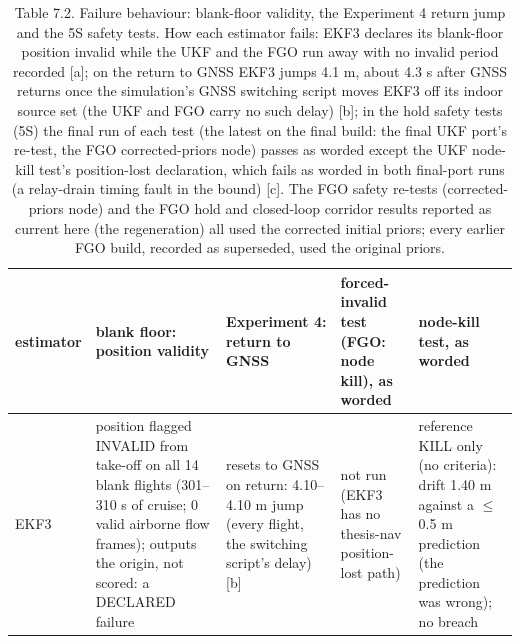 \begin{table}[htbp]
\centering
\footnotesize
\caption{Table 7.2. Failure behaviour: blank-floor validity, the Experiment 4 return jump and the 5S safety tests. How each estimator fails: EKF3 declares its blank-floor position invalid while the UKF and the FGO run away with no invalid period recorded [a]; on the return to GNSS EKF3 jumps 4.1 m, about 4.3 s after GNSS returns once the simulation's GNSS switching script moves EKF3 off its indoor source set (the UKF and FGO carry no such delay) [b]; in the hold safety tests (5S) the final run of each test (the latest on the final build: the final UKF port's re-test, the FGO corrected-priors node) passes as worded except the UKF node-kill test's position-lost declaration, which fails as worded in both final-port runs (a relay-drain timing fault in the bound) [c]. The FGO safety re-tests (corrected-priors node) and the FGO hold and closed-loop corridor results reported as current here (the regeneration) all used the corrected initial priors; every earlier FGO build, recorded as superseded, used the original priors.}
\label{tab:7-2}
\begin{tabular}{p{}p{}p{}p{}p{}}
\toprule
\textbf{estimator} & \textbf{blank floor: position validity} & \textbf{Experiment 4: return to GNSS} & \textbf{forced-invalid test (FGO: node kill), as worded} & \textbf{node-kill test, as worded} \\
\midrule
EKF3 & position flagged INVALID from take-off on all 14 blank flights (301--310 s of cruise; 0 valid airborne flow frames); outputs the origin, not scored: a DECLARED failure & resets to GNSS on return: 4.10--4.10 m jump (every flight, the switching script's delay) [b] & not run (EKF3 has no thesis-nav position-lost path) & reference KILL only (no criteria): drift 1.40 m against a $\le$ 0.5 m prediction (the prediction was wrong); no breach \\

\end{tabular}
\end{table}
